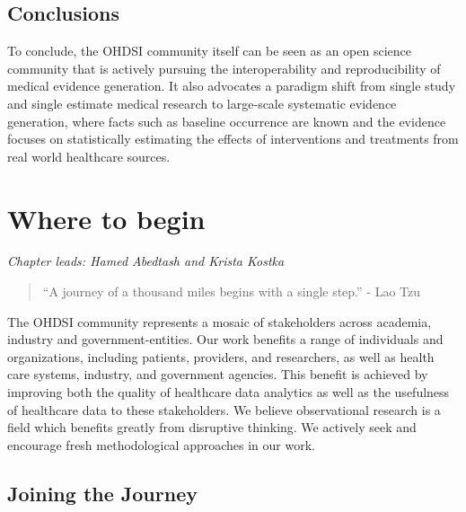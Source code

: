 \documentclass[11pt]{book}
\theoremstyle{definition}
\theoremstyle{definition}
\theoremstyle{definition}
\theoremstyle{remark}
\begin{document}
\hypertarget{conclusions}{%
\section{Conclusions}\label{conclusions}}

To conclude, the OHDSI community itself can be seen as an open science community that is actively pursuing the interoperability and reproducibility of medical evidence generation. It also advocates a paradigm shift from single study and single estimate medical research to large-scale systematic evidence generation, where facts such as baseline occurrence are known and the evidence focuses on statistically estimating the effects of interventions and treatments from real world healthcare sources.

\hypertarget{WhereToBegin}{%
\chapter{Where to begin}\label{WhereToBegin}}

\emph{Chapter leads: Hamed Abedtash and Krista Kostka}

\begin{quote}
``A journey of a thousand miles begins with a single step.'' - Lao Tzu
\end{quote}

The OHDSI community represents a mosaic of stakeholders across academia, industry and government-entities. Our work benefits a range of individuals and organizations, including patients, providers, and researchers, as well as health care systems, industry, and government agencies. This benefit is achieved by improving both the quality of healthcare data analytics as well as the usefulness of healthcare data to these stakeholders. We believe observational research is a field which benefits greatly from disruptive thinking. We actively seek and encourage fresh methodological approaches in our work. 

\hypertarget{joining-the-journey}{%
\section{Joining the Journey}\label{joining-the-journey}}
\end{document}
